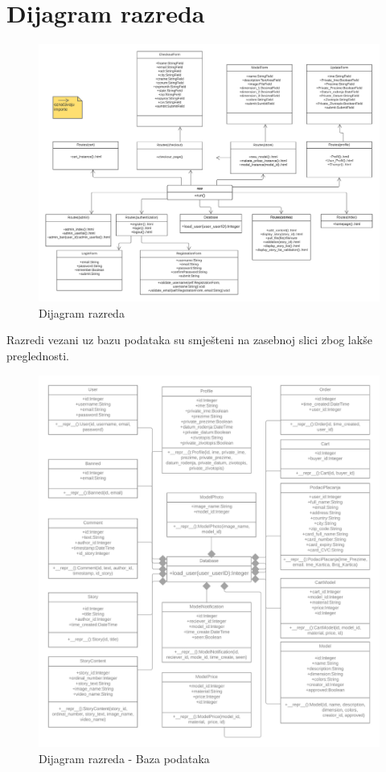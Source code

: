 			
		\section{Dijagram razreda}
				
			\begin{figure}[H]
				\includegraphics[width=.9\linewidth]{slike/Dijagram_razreda.PNG} %
				\caption{Dijagram razreda}
				\label{fig:diraz1} %
			\end{figure}
		
			Razredi vezani uz bazu podataka su smješteni na zasebnoj slici zbog lakše preglednosti.
		
			\begin{figure}[H]
				\includegraphics[width=.9\linewidth]{slike/Dijagram_razreda_baza.PNG} %
				\caption{Dijagram razreda - Baza podataka}
				\label{fig:diraz2} %
			\end{figure}
		

